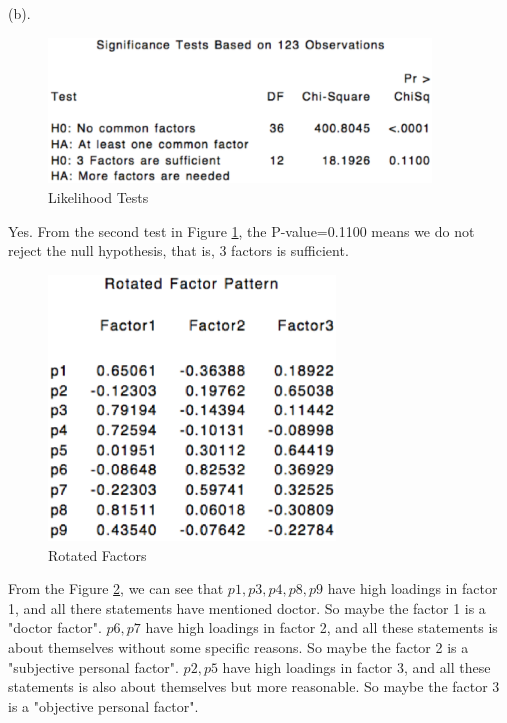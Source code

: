 \documentclass[letterpaper, 12pt]{article}
\begin{document}
(b). \begin{figure}[htbp]
\centering\includegraphics[width=4in]{7-7.eps}
\caption{Likelihood Tests}\label{7}
\end{figure}
Yes. From the second test in Figure \ref{7}, the P-value=0.1100 means we do not reject the null hypothesis, that is, 3 factors is sufficient.

\begin{figure}[htbp]
\centering\includegraphics[width=3in]{7-8.eps}
\caption{Rotated Factors}\label{8}
\end{figure}
From the Figure \ref{8}, we can see that $p1,p3,p4,p8,p9$ have high loadings in factor 1, and all there statements have mentioned doctor. So maybe the factor 1 is a "doctor factor". $p6,p7$ have high loadings in factor 2, and all these statements is about themselves without some specific reasons. So maybe the factor 2 is a "subjective personal factor". $p2,p5$ have high loadings in factor 3, and all these statements is also about themselves but more reasonable. So maybe the factor 3 is a "objective personal factor".
\end{document}
